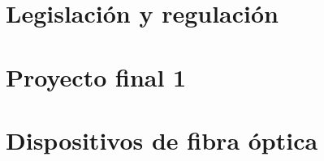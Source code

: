 \documentclass[12pt,fleqn,a4paper,oneside]{LegrandOrangeBook}
\begin{document}
\part{Legislación y regulación}

\part{Proyecto final 1}


\part{Dispositivos de fibra óptica}



\end{document}
